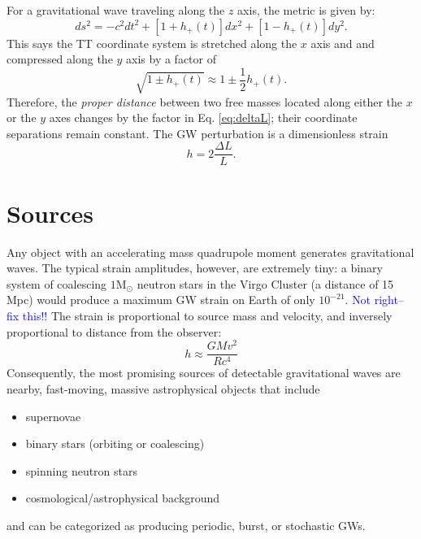 For a gravitational wave traveling along the $z$ axis, the metric is
given by:
\begin{equation}
ds^2 = -c^2dt^2 + [1+h_+(t)] dx^2 + [1-h_+(t)] dy^2.
\end{equation}
This says the TT coordinate system is stretched along the $x$ axis and
and compressed along the $y$ axis by a factor of 
\begin{equation}
\sqrt{1 \pm h_+(t)} \approx 1 \pm \frac{1}{2} h_+(t).
\label{eq:deltaL}
\end{equation}
Therefore, the \emph{proper distance} between two free masses located
along either the $x$ or the $y$ axes changes by the factor in
Eq. \ref{eq:deltaL}; their coordinate separations remain constant. The
GW perturbation is a dimensionless strain
\begin{equation}
h = 2 \frac{\Delta L}{L}.
\end{equation}



\section{Sources}
Any object with an accelerating mass quadrupole moment generates
gravitational waves. The typical strain amplitudes, however, are
extremely tiny: a binary system of coalescing $1 \mbox{M}_\odot$
neutron stars in the Virgo Cluster (a distance of 15 Mpc) would
produce a maximum GW strain on Earth of only
$10^{-21}$. \textcolor{blue}{Not right--fix this!!} The strain is
proportional to source mass and velocity, and inversely proportional
to distance from the observer:
\begin{equation}
h \approx \frac{GMv^2}{Rc^4}
\end{equation}
Consequently, the most promising sources of detectable gravitational
waves are nearby, fast-moving, massive astrophysical objects that
include
\begin{itemize}
\item supernovae \vspace{-10pt}
\item binary stars (orbiting or coalescing) \vspace{-10pt}
\item spinning neutron stars \vspace{-10pt}
\item cosmological/astrophysical background
\end{itemize}
and can be categorized as producing periodic, burst, or stochastic GWs.

